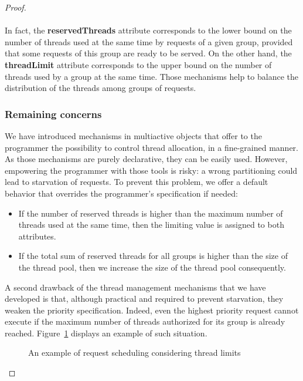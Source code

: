 \documentclass[11pt]{report}
\begin{document}
\begin{proof}
\paragraph{}
In fact, the \textbf{reservedThreads} attribute corresponds to the lower bound on the number of threads used at the same time by requests of a given group, provided that some requests of this group are ready to be served. On the other hand, the \textbf{threadLimit} attribute corresponds to the upper bound on the number of threads used by a group at the same time. Those mechanisms help to balance the distribution of the threads among groups of requests.

\subsubsection{Remaining concerns}
We have introduced mechanisms in multiactive objects that offer to the programmer the possibility to control thread allocation, in a fine-grained manner. As those mechanisms are purely declarative, they can be easily used. However, empowering the programmer with those tools is risky: a wrong partitioning could lead to starvation of requests. To prevent this problem, we offer a default behavior that overrides the programmer's specification if needed:
\begin{itemize}
\item If the number of reserved threads is higher than the maximum number of threads used at the same time, then the limiting value is assigned to both attributes.
\item If the total sum of reserved threads for all groups is higher than the size of the thread pool, then we increase the size of the thread pool consequently.
\end{itemize}
A second drawback of the thread management mechanisms that we have developed is that, although practical and required to prevent starvation, they weaken the priority specification. Indeed, even the highest priority request cannot execute if the maximum number of threads authorized for its group is already reached. Figure~\ref{fig:thread_limit} displays an example of such situation.

\begin{figure}[!ht]
      \caption{An example of request scheduling considering thread limits}
      \label{fig:thread_limit} 
\end{figure}


\end{proof}
\end{document}
